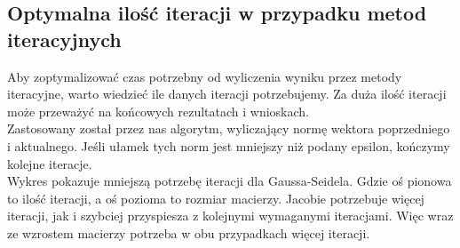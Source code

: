 \documentclass[8pt]{article}
\begin{document}
\begin{center}
\end{center}


\subsection*{Optymalna ilość iteracji w przypadku metod iteracyjnych}
Aby zoptymalizować czas potrzebny od wyliczenia wyniku przez metody iteracyjne, warto wiedzieć ile danych iteracji potrzebujemy. Za duża ilość iteracji może przeważyć na końcowych rezultatach i wnioskach.\\
Zastosowany został przez nas algorytm, wyliczający normę wektora poprzedniego i aktualnego. Jeśli ułamek tych norm jest mniejszy niż podany epsilon, kończymy kolejne iteracje. \\
Wykres pokazuje mniejszą potrzebę iteracji dla Gaussa-Seidela. Gdzie oś pionowa to ilość iteracji, a oś pozioma to rozmiar macierzy. Jacobie potrzebuje więcej iteracji, jak i szybciej przyspiesza z kolejnymi wymaganymi iteracjami. Więc wraz ze wzrostem macierzy potrzeba w obu przypadkach więcej iteracji.
\begin{center}
\end{center}
\end{document}
